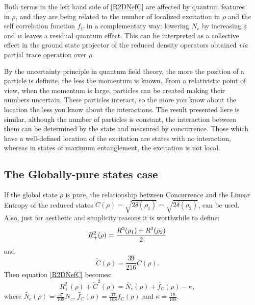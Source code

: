 \documentclass[aps,prl,preprint]{revtex4-1}
\begin{document}
	
	Both terms in the left hand side of 
	\eqref{R2DNefC} are affected by quantum features in $\rho$,
	and they are being related to the number of 
	localized excitation in $\rho$ and the 
	self correlation function $f_C$
	in a 
	complementary way: lowering $N_e$ by increasing
	$z$ and $w$ leaves a residual quantum effect.
	This can be interpreted as a collective effect in the ground state projector
	of the reduced density operators obtained {\em via} partial trace
	operation over $\rho$.
	
	By the uncertainty principle in quantum field theory, 
	the more the position of a particle 
	is definite,  the less the momentum is known. From 
	a relativistic point of view, when the momentum is large, particles can be 
	created making their numbers uncertain. These particles interact, so the more 
	you know about the location the less you know about the interactions. The 
	result presented here is similar, although the number of particles is constant, 
	the interaction between them can be determined by the state and measured by 
	concurrence. Those which have a well-defined location of the excitation are 
	states with no interaction, whereas in states of maximum entanglement, the 
	excitation is not local.
	
	\subsection{The Globally-pure states case}
	If the global state $\rho$ is pure, the relationship between
	Concurrence and the Linear Entropy of the reduced states
	$C(\rho) = \sqrt{2\delta(\rho_1)} = \sqrt{2\delta(\rho_2)}$,
	can be used.
	Also, just for aesthetic and simplicity reasons it is worthwhile to define:
	\begin{equation}
	R_+^2(\rho) = \frac{R^2(\rho_1) + R^2(\rho_2)}{2}\\
	\end{equation}
	and 
	\begin{equation}
	\tilde{C}(\rho)  = \frac{39}{216}C(\rho).
	\end{equation}	
	Then equation \eqref{R2DNefC} becomes:
	\begin{equation}
	R_+^2(\rho) + \tilde{C}^2(\rho)= \tilde{N_e}(\rho) + \tilde{f_C}(\rho) - \kappa,
	\label{R2CNefC}
	\end{equation}
	where $\tilde{N_e}(\rho)= \frac{37}{108}N_e $,  $\tilde{f_C}(\rho)=\frac{37}{108} f_C(\rho)$ and $\kappa=\frac{19}{108}$.
	
\end{document}
